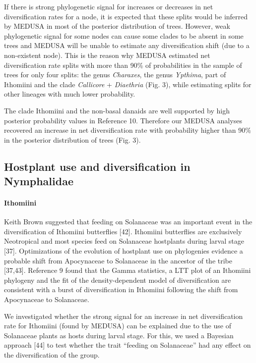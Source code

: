 \documentclass[10pt]{article}
\begin{document}
If there is strong phylogenetic signal for increases or decreases in net
diversification rates for a node, it is expected that these splits would
be inferred by MEDUSA in most of the posterior distribution of trees.
However, weak phylogenetic signal for some nodes can cause some clades
to be absent in some trees and MEDUSA will be unable to estimate any
diversification shift (due to a non-existent node). This is the reason
why MEDUSA estimated net diversification rate splits with more than 90\%
of probabilities in the sample of trees for only four splits: the genus
\emph{Charaxes}, the genus \emph{Ypthima}, part of Ithomiini and the
clade \emph{Callicore} + \emph{Diaethria} (Fig. 3), while estimating
splits for other lineages with much lower probability.

The clade Ithomiini and the non-basal danaids are well supported by high
posterior probability values in Reference 10. Therefore our MEDUSA
analyses recovered an increase in net diversification rate with
probability higher than 90\% in the posterior distribution of trees
(Fig. 3).

\subsection*{Hostplant use and diversification in
Nymphalidae}

\paragraph*{Ithomiini}

Keith Brown suggested that feeding on Solanaceae was an important event
in the diversification of Ithomiini butterflies {[}42{]}. Ithomiini
butterflies are exclusively Neotropical and most species feed on
Solanaceae hostplants during larval stage {[}37{]}. Optimizations of the
evolution of hostplant use on phylogenies evidence a probable shift from
Apocynaceae to Solanaceae in the ancestor of the tribe {[}37,43{]}.
Reference 9 found that the Gamma statistics, a LTT plot of an Ithomiini
phylogeny and the fit of the density-dependent model of diversification
are consistent with a burst of diversification in Ithomiini following
the shift from Apocynaceae to Solanaceae.

We investigated whether the strong signal for an increase in net
diversification rate for Ithomiini (found by MEDUSA) can be explained
due to the use of Solanaceae plants as hosts during larval stage. For
this, we used a Bayesian approach {[}44{]} to test whether the trait
``feeding on Solanaceae'' had any effect on the diversification of the
group.
\end{document}
